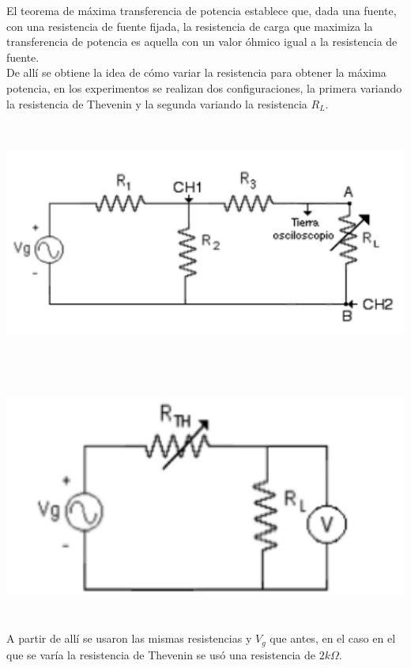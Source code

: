 \documentclass[12pt]{article}
\begin{document}
\begin{enumerate}
		El teorema de máxima transferencia de potencia establece que, dada una fuente, con una resistencia de fuente fijada, la resistencia de carga que maximiza la transferencia de potencia es aquella con un valor óhmico igual a la resistencia de fuente.\\
		
		De allí se obtiene la idea de cómo variar la resistencia para obtener la máxima potencia, en los experimentos se realizan dos configuraciones, la primera variando la resistencia de Thevenin y la segunda variando la resistencia $R_L$.
		
		\begin{center}
			\includegraphics[width=16cm,height=8cm]{Img/circ_2}
		\end{center}
		
		\begin{center}
			\includegraphics[width=16cm,height=8cm]{Img/circ_3}
		\end{center}
		
		A partir de allí se usaron las mismas resistencias y $V_g$ que antes, en el caso en el que se varía la resistencia de Thevenin se usó una resistencia de $2k\Omega$.
		

\end{enumerate}
\end{document}
